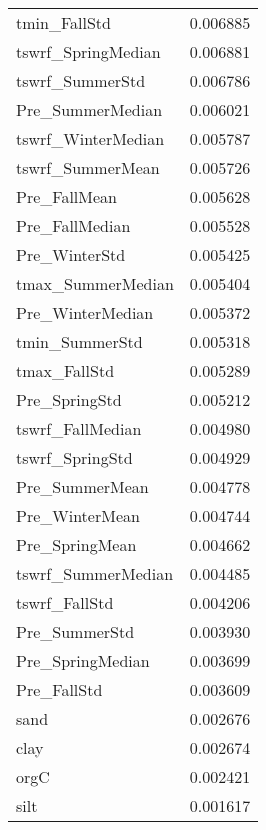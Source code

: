 \begin{tabular}{lr}
tmin_FallStd & 0.006885 \\
tswrf_SpringMedian & 0.006881 \\
tswrf_SummerStd & 0.006786 \\
Pre_SummerMedian & 0.006021 \\
tswrf_WinterMedian & 0.005787 \\
tswrf_SummerMean & 0.005726 \\
Pre_FallMean & 0.005628 \\
Pre_FallMedian & 0.005528 \\
Pre_WinterStd & 0.005425 \\
tmax_SummerMedian & 0.005404 \\
Pre_WinterMedian & 0.005372 \\
tmin_SummerStd & 0.005318 \\
tmax_FallStd & 0.005289 \\
Pre_SpringStd & 0.005212 \\
tswrf_FallMedian & 0.004980 \\
tswrf_SpringStd & 0.004929 \\
Pre_SummerMean & 0.004778 \\
Pre_WinterMean & 0.004744 \\
Pre_SpringMean & 0.004662 \\
tswrf_SummerMedian & 0.004485 \\
tswrf_FallStd & 0.004206 \\
Pre_SummerStd & 0.003930 \\
Pre_SpringMedian & 0.003699 \\
Pre_FallStd & 0.003609 \\
sand & 0.002676 \\
clay & 0.002674 \\
orgC & 0.002421 \\
silt & 0.001617 \\
\bottomrule
\end{tabular}
